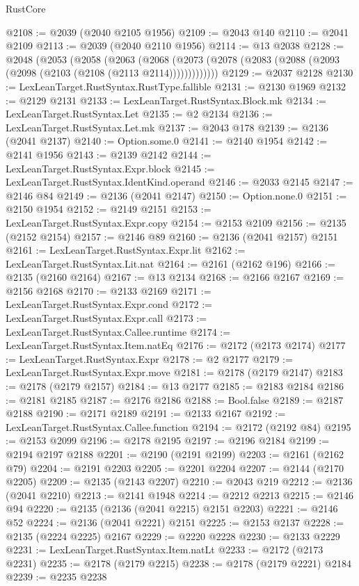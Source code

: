 \begin{lexlean}{RustCore}
\begin{coremodule}
@2108 := @2039 (@2040 @2105 @1956)
@2109 := @2043 @140
@2110 := @2041 @2109
@2113 := @2039 (@2040 @2110 @1956)
@2114 := @13 @2038
@2128 := @2048
    (@2053
      (@2058
        (@2063
          (@2068 (@2073 (@2078 (@2083 (@2088 (@2093 (@2098 (@2103 (@2108 (@2113 @2114)))))))))))))
@2129 := @2037 @2128
@2130 := LexLeanTarget.RustSyntax.RustType.fallible
@2131 := @2130 @1969
@2132 := @2129 @2131
@2133 := LexLeanTarget.RustSyntax.Block.mk
@2134 := LexLeanTarget.RustSyntax.Let
@2135 := @2 @2134
@2136 := LexLeanTarget.RustSyntax.Let.mk
@2137 := @2043 @178
@2139 := @2136 (@2041 @2137)
@2140 := Option.some.{0}
@2141 := @2140 @1954
@2142 := @2141 @1956
@2143 := @2139 @2142
@2144 := LexLeanTarget.RustSyntax.Expr.block
@2145 := LexLeanTarget.RustSyntax.IdentKind.operand
@2146 := @2033 @2145
@2147 := @2146 @84
@2149 := @2136 (@2041 @2147)
@2150 := Option.none.{0}
@2151 := @2150 @1954
@2152 := @2149 @2151
@2153 := LexLeanTarget.RustSyntax.Expr.copy
@2154 := @2153 @2109
@2156 := @2135 (@2152 @2154)
@2157 := @2146 @89
@2160 := @2136 (@2041 @2157) @2151
@2161 := LexLeanTarget.RustSyntax.Expr.lit
@2162 := LexLeanTarget.RustSyntax.Lit.nat
@2164 := @2161 (@2162 @196)
@2166 := @2135 (@2160 @2164)
@2167 := @13 @2134
@2168 := @2166 @2167
@2169 := @2156 @2168
@2170 := @2133 @2169
@2171 := LexLeanTarget.RustSyntax.Expr.cond
@2172 := LexLeanTarget.RustSyntax.Expr.call
@2173 := LexLeanTarget.RustSyntax.Callee.runtime
@2174 := LexLeanTarget.RustSyntax.Item.natEq
@2176 := @2172 (@2173 @2174)
@2177 := LexLeanTarget.RustSyntax.Expr
@2178 := @2 @2177
@2179 := LexLeanTarget.RustSyntax.Expr.move
@2181 := @2178 (@2179 @2147)
@2183 := @2178 (@2179 @2157)
@2184 := @13 @2177
@2185 := @2183 @2184
@2186 := @2181 @2185
@2187 := @2176 @2186
@2188 := Bool.false
@2189 := @2187 @2188
@2190 := @2171 @2189
@2191 := @2133 @2167
@2192 := LexLeanTarget.RustSyntax.Callee.function
@2194 := @2172 (@2192 @84)
@2195 := @2153 @2099
@2196 := @2178 @2195
@2197 := @2196 @2184
@2199 := @2194 @2197 @2188
@2201 := @2190 (@2191 @2199)
@2203 := @2161 (@2162 @79)
@2204 := @2191 @2203
@2205 := @2201 @2204
@2207 := @2144 (@2170 @2205)
@2209 := @2135 (@2143 @2207)
@2210 := @2043 @219
@2212 := @2136 (@2041 @2210)
@2213 := @2141 @1948
@2214 := @2212 @2213
@2215 := @2146 @94
@2220 := @2135 (@2136 (@2041 @2215) @2151 @2203)
@2221 := @2146 @52
@2224 := @2136 (@2041 @2221) @2151
@2225 := @2153 @2137
@2228 := @2135 (@2224 @2225) @2167
@2229 := @2220 @2228
@2230 := @2133 @2229
@2231 := LexLeanTarget.RustSyntax.Item.natLt
@2233 := @2172 (@2173 @2231)
@2235 := @2178 (@2179 @2215)
@2238 := @2178 (@2179 @2221) @2184
@2239 := @2235 @2238

\end{coremodule}
\end{lexlean}
